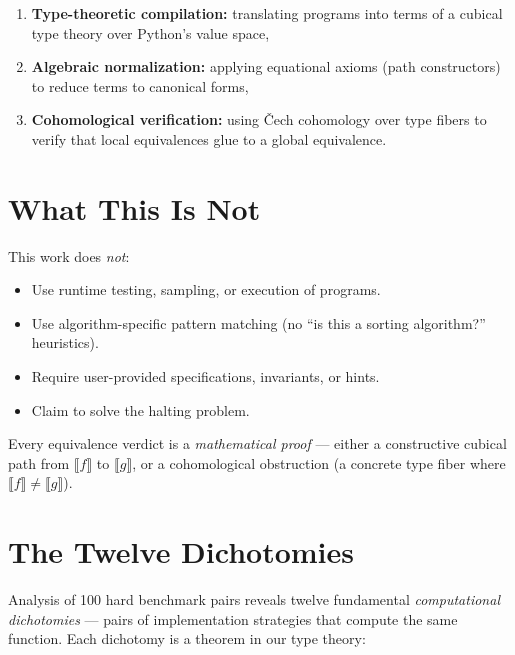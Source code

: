 \documentclass[11pt,a4paper]{report}
\theoremstyle{definition}
\theoremstyle{plain}
\newcommand{\den}[1]{\llbracket #1 \rrbracket}     %
\begin{document}
\begin{enumerate}[label=(\roman*)]
  \item \textbf{Type-theoretic compilation:} translating programs into
    terms of a cubical type theory over Python's value space,
  \item \textbf{Algebraic normalization:} applying equational axioms
    (path constructors) to reduce terms to canonical forms,
  \item \textbf{Cohomological verification:} using \v{C}ech cohomology
    over type fibers to verify that local equivalences glue to a
    global equivalence.
\end{enumerate}

\section{What This Is Not}

This work does \emph{not}:
\begin{itemize}
  \item Use runtime testing, sampling, or execution of programs.
  \item Use algorithm-specific pattern matching (no ``is this a
    sorting algorithm?'' heuristics).
  \item Require user-provided specifications, invariants, or hints.
  \item Claim to solve the halting problem.
\end{itemize}

Every equivalence verdict is a \emph{mathematical proof} ---
either a constructive cubical path from $\den{f}$ to $\den{g}$,
or a cohomological obstruction (a concrete type fiber where
$\den{f} \neq \den{g}$).

\section{The Twelve Dichotomies}

Analysis of 100 hard benchmark pairs reveals twelve fundamental
\emph{computational dichotomies} --- pairs of implementation strategies
that compute the same function.  Each dichotomy is a theorem in our
type theory:
\end{document}
